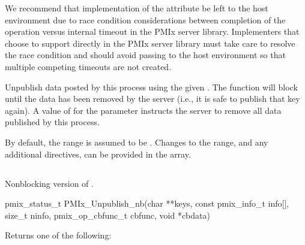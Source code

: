 \adviceimplstart
We recommend that implementation of the  attribute be left to the host environment due to race condition considerations between completion of the operation versus internal timeout in the \ac{PMIx} server library. Implementers that choose to support  directly in the \ac{PMIx} server library must take care to resolve the race condition and should avoid passing  to the host environment so that multiple competing timeouts are not created.
\adviceimplend


\descr

Unpublish data posted by this process using the given .
The function will block until the data has been removed by the server (i.e., it is safe to publish that key again).
A value of  for the  parameter instructs the server to remove all data published by this process.

By default, the range is assumed to be .
Changes to the range, and any additional directives, can be provided in the  array.


\subsection{}

\summary

Nonblocking version of .

\format

\cspecificstart
\begin{codepar}
pmix_status_t
PMIx_Unpublish_nb(char **keys,
                  const pmix_info_t info[], size_t ninfo,
                  pmix_op_cbfunc_t cbfunc, void *cbdata)
\end{codepar}
\cspecificend

\begin{arglist}
\end{arglist}

Returns one of the following:

